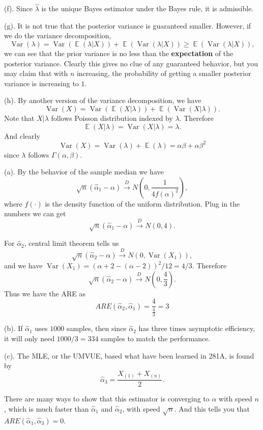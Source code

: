 \documentclass[12pt]{article}
\newcommand{\1}{\mathbbm{1}}
\newenvironment{problem}[2][Problem]{\begin{trivlist}
\item[\hskip \labelsep {\bfseries #1}\hskip \labelsep {\bfseries #2.}]}{\end{trivlist}}
\newcommand{\E}{\operatorname{\mathbb{E}}}
\newcommand{\var}[1]{\operatorname{Var}\left(#1\right)}
\begin{document}
(f). Since $\hat{\lambda}$ is the unique Bayes estimator under the Bayes rule, it is admissible.

(g). It is not true that the posterior variance is guaranteed smaller. However, if we do the variance decomposition,
$$
\var{\lambda}  = \var{\E (\lambda|X)} + \E (\var{ \lambda |X}) \geq \E (\var{ \lambda |X}) ,
$$
we can see that the prior variance is no less than the \textbf{expectation} of the posterior variance. Clearly this gives no clue of any guaranteed behavior, but you may claim that with $n$ increasing, the probability of getting a smaller posterior variance is increasing to $1 $.

(h). By another version of the variance decomposition, we have
$$
\var{X} = \var{ \E (X |\lambda) } + \E( \var{X|\lambda}).
$$
Note that $X|\lambda$ follows Poisson distribution indexed by $\lambda$. Therefore 
$$
\E (X |\lambda) = \var{X|\lambda} = \lambda.
$$
And clearly
$$
\var{X} = \var{ \lambda } + \E( \lambda) = \alpha \beta + \alpha \beta^2
$$
since $\lambda $ follows $\Gamma(\alpha,\beta)$.

\begin{problem}{2}
\end{problem}

(a). By the behavior of the sample median we have
$$
\sqrt{n} (\hat{\alpha}_1 - \alpha) \xrightarrow{D} N(0, \frac{1}{4f(\alpha)^2}),
$$ 
where $f(\cdot)$ is the density function of the uniform distribution. Plug in the numbers we can get 
$$
\sqrt{n} (\hat{\alpha}_1 - \alpha) \xrightarrow{D} N(0, 4).
$$ 

For $\hat{\alpha}_2$, central limit theorem tells us
$$
\sqrt{n} (\hat{\alpha}_2 - \alpha) \xrightarrow{D} N(0, \var{X_1}),
$$
and we have $\var{X_1} = (\alpha+2 - (\alpha-2) )^2 /12 = 4/3$. Therefore
$$
\sqrt{n} (\hat{\alpha}_2 - \alpha) \xrightarrow{D} N(0, \frac{4}{3}).
$$
Thus we have the ARE as
$$
ARE(\hat{\alpha}_2 , \hat{\alpha}_1 ) = \frac{4}{\frac{4}{3}} = 3
$$

(b). If $\hat{\alpha}_1$ uses $1000$ samples, then since $\hat{\alpha}_2$ has three times asymptotic efficiency, it will only need $1000/3 = 334$ samples to match the performance.

(c). The MLE, or the UMVUE, based what have been learned in 281A, is found by 
$$
\hat{\alpha}_3 = \frac{X_{(1)} + X_{(n)}}{2}.
$$

There are many ways to show that this estimator is converging to $\alpha$ with speed $n$, which is much faster than $\hat{\alpha}_1$ and $\hat{\alpha}_2$, with speed $\sqrt n$. And this tells you that $ARE(\hat{\alpha}_1,\hat{\alpha}_3) = 0$. 
\end{document}
